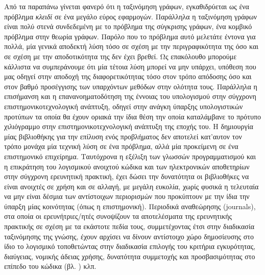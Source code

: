 Από τα παραπάνω γίνεται φανερό ότι η ταξινόμηση γράφων, εγκαθιδρύεται ως ένα πρόβλημα \textit{κλειδί} σε ένα μεγάλο εύρος εφαρμογών.
Παράλληλα η ταξινόμηση γράφων είναι πολύ στενά συνδεδεμένη με το πρόβλημα της σύγκρισης γράφων, ένα κομβικό πρόβλημα στην θεωρία γράφων.
Παρόλο που το πρόβλημα αυτό μελετάτε έντονα για πολλά, μία γενικά αποδεκτή λύση τόσο σε σχέση με την περιγραφικότητα της όσο και σε σχέση με την αποδοτικότητα της δεν έχει βρεθεί.
Ως επακόλουθο μπορούμε κάλλιστα να συμπεράνουμε ότι μία τέτοια λύση μπορεί να μην υπάρχει, υπόθεση που μας οδηγεί στην αποδοχή της διαφορετικότητας τόσο στον τρόπο απόδοσης όσο και στον βαθμό προσέγγισης των υπαρχόντων μεθόδων στην ολότητα τους.
Παράλληλα η επισήμανση και η επανανοηματοδότηση της έννοιας του υπολογισμού στην σύγχρονη επιστημονικοτεχνολογική ανάπτυξη, οδηγεί στην ανάγκη ύπαρξης υπολογιστικών προτύπων τα οποία θα έχουν οριακά την ίδια θέση την οποία καταλάμβανε το πρότυπο χιλιόγραμμο στην επιστημονικοτεχνολογική ανάπτυξη της εποχής του.
Η δημιουργία μίας βιβλιοθήκης για την επίλυση ενός προβλήματος δεν αποτελεί κατ'αυτον τον τρόπο μονάχα μία τεχνική λύση σε ένα πρόβλημα, αλλά μία προκείμενη σε ένα επιστημονικό επιχείρημα.
Ταυτόχρονα η εξέλιξη των γλωσσών προγραμματισμού και η επικράτηση του λογισμικού ανοιχτού κώδικα και των ηλεκτρονικών αποθετηρίων στην σύγχρονη ερευνητική πρακτική, έχει δώσει την δυνατότητα οι βιβλιοθήκες να είναι ανοιχτές σε χρήση και σε αλλαγή, με μεγάλη ευκολία, χωρίς φυσικά η τελευταία να μην είναι δέσμια των αντίστοιχων περιορισμών που προκύπτουν με την ίδια την ύπαρξη μίας κοινότητας (όπως η επιστημονική).
Περιοδικά αναθεώρησης (journals), στα οποία οι ερευνήτριες/ητές συνοψίζουν τα αποτελέσματα της ερευνητικής πρακτικής σε σχέση με τα εκάστοτε πεδία τους, συμμετέχοντας έτσι στην διαδικασία ταξινόμησης της γνώσης, έχουν αρχίσει να δίνουν αντίστοιχο χώρο δημοσίευσης στο ίδιο το λογισμικό τοποθετώντας στην διαδικασία επιλογής του κριτήρια εγκυρότητας, διαύγειας, νομικής άδειας χρήσης, δυνατότητα συμμετοχής και προσβασιμότητας στο επίπεδο του κώδικα (βλ. \href{http://www.jmlr.org/mloss/mloss-info.html}{}) κλπ.

